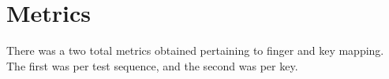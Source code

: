 \documentclass{report}
\begin{document}






\section{Metrics}
\label{section:metric}

There was a two total metrics obtained pertaining to finger and key mapping.
The first was per test sequence, and the second was per key.
\end{document}
